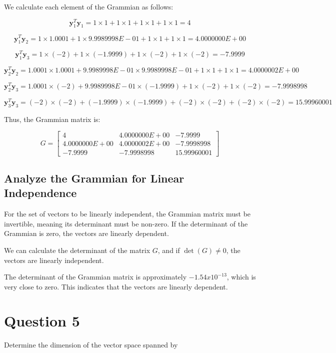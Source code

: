 \documentclass{article}
\begin{document}
We calculate each element of the Grammian as follows:

\[
\mathbf{y}_1^T \mathbf{y}_1 = 1 \times 1 + 1 \times 1 + 1 \times 1 + 1 \times 1 = 4
\]

\[
\mathbf{y}_1^T \mathbf{y}_2 = 1 \times 1.0001 + 1 \times 9.9989998E-01 + 1 \times 1 + 1 \times 1 = 4.0000000E+00
\]

\[
\mathbf{y}_1^T \mathbf{y}_3 = 1 \times (-2) + 1 \times (-1.9999) + 1 \times (-2) + 1 \times (-2) = -7.9999
\]

\[
\mathbf{y}_2^T \mathbf{y}_2 = 1.0001 \times 1.0001 + 9.9989998E-01 \times 9.9989998E-01 + 1 \times 1 + 1 \times 1 = 4.0000002E+00
\]

\[
\mathbf{y}_2^T \mathbf{y}_3 = 1.0001 \times (-2) + 9.9989998E-01 \times (-1.9999) + 1 \times (-2) + 1 \times (-2) = -7.9998998
\]

\[
\mathbf{y}_3^T \mathbf{y}_3 = (-2) \times (-2) + (-1.9999) \times (-1.9999) + (-2) \times (-2) + (-2) \times (-2) = 15.99960001
\]

Thus, the Grammian matrix is:

\[
G = \begin{bmatrix}
4 & 4.0000000E+00 & -7.9999 \\
4.0000000E+00 & 4.0000002E+00 & -7.9998998 \\
-7.9999 & -7.9998998 & 15.99960001
\end{bmatrix}
\]

\subsection{Analyze the Grammian for Linear Independence}

For the set of vectors to be linearly independent, the Grammian matrix must be invertible, meaning its determinant must be non-zero. If the determinant of the Grammian is zero, the vectors are linearly dependent.

We can calculate the determinant of the matrix \( G \), and if \( \det(G) \neq 0 \), the vectors are linearly independent.

The determinant of the Grammian matrix is approximately 
$-1.54x10^{-13}$, which is very close to zero. This indicates that the vectors are linearly dependent.

\section{Question 5}

Determine the dimension of the vector space spanned by 
\end{document}
